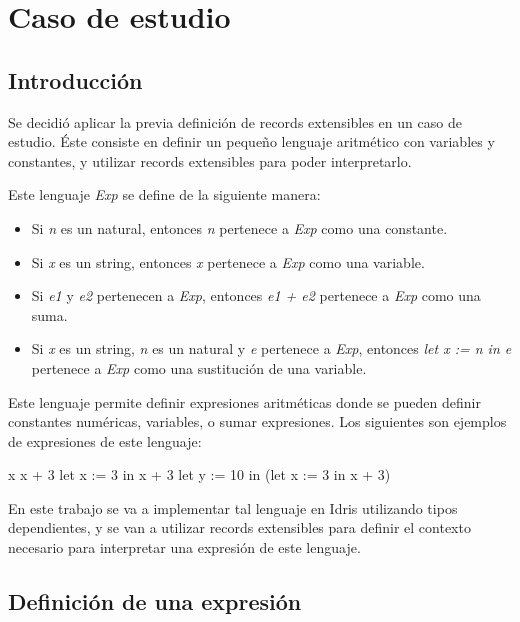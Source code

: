 
\chapter{Caso de estudio}
\label{ch:4}

\section{Introducción}

Se decidió aplicar la previa definición de records extensibles en un caso de estudio. Éste consiste en definir un pequeño lenguaje aritmético con variables y constantes, y utilizar records extensibles para poder interpretarlo.

Este lenguaje \textit{Exp} se define de la siguiente manera:
\begin{itemize}
\item Si \textit{n} es un natural, entonces \textit{n} pertenece a \textit{Exp} como una constante.
\item Si \textit{x} es un string, entonces \textit{x} pertenece a \textit{Exp} como una variable.
\item Si \textit{e1} y \textit{e2} pertenecen a \textit{Exp}, entonces \textit{e1 + e2} pertenece a \textit{Exp} como una suma.
\item Si \textit{x} es un string, \textit{n} es un natural y \textit{e} pertenece a \textit{Exp}, entonces \textit{let x := n in e} pertenece a \textit{Exp} como una sustitución de una variable.
\end{itemize}

Este lenguaje permite definir expresiones aritméticas donde se pueden definir constantes numéricas, variables, o sumar expresiones. Los siguientes son ejemplos de expresiones de este lenguaje:

\begin{code}
x
x + 3
let x := 3 in x + 3
let y := 10 in (let x := 3 in x + 3)
\end{code}

En este trabajo se va a implementar tal lenguaje en Idris utilizando tipos dependientes, y se van a utilizar records extensibles para definir el contexto necesario para interpretar una expresión de este lenguaje.

\section{Definición de una expresión}


